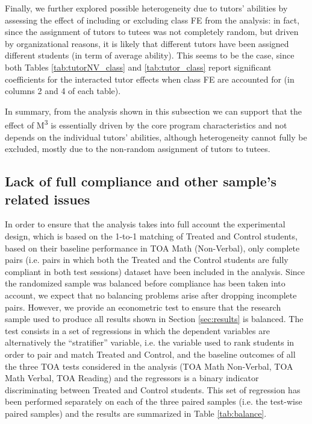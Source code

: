 \documentclass[ 12 pt]{article}
\begin{document}


Finally, we further explored possible heterogeneity due to tutors' abilities by assessing the effect of including or excluding class FE from the analysis: in fact, since the assignment of tutors to tutees was not completely random, but driven by organizational reasons, it is likely that different tutors have been assigned different students (in term of average ability). This seems to be the case, since both Tables \ref{tab:tutorNV_class} and \ref{tab:tutor_class} report significant coefficients for the interacted tutor effects when class FE are accounted for (in columns 2 and 4 of each table).

%




In summary, from the analysis shown in this subsection we can support that the effect of M\textsuperscript{3} is essentially driven by the core program characteristics and not depends on the individual tutors' abilities, although heterogeneity cannot fully be excluded, mostly due to the non-random assignment of tutors to tutees.

\subsection{Lack of full compliance and other sample's related issues}
In order to ensure that the analysis takes into full account the experimental design, which is based on the 1-to-1 matching of Treated and Control students, based on their baseline performance in TOA Math (Non-Verbal), only complete pairs (i.e. pairs in which both the Treated and the Control students are fully compliant in both test sessions) dataset have been included in the analysis. Since the randomized sample was balanced before compliance has been taken into account, we expect that no balancing problems arise after dropping incomplete pairs. However, we provide an econometric test to ensure that the research sample used to produce all results shown in Section \ref{sec:results} is balanced. The test consists in a set of regressions in which the dependent variables are alternatively the \enquote{stratifier} variable, i.e. the variable used to rank students in order to pair and match Treated and Control, and the baseline outcomes of all the three TOA tests considered in the analysis (TOA Math Non-Verbal, TOA Math Verbal, TOA Reading) and the regressors is a binary indicator discriminating between Treated and Control students. This set of regression has been performed separately on each of the three paired samples (i.e. the test-wise paired samples) and the results are summarized in Table \ref{tab:balance}. 
\end{document}
